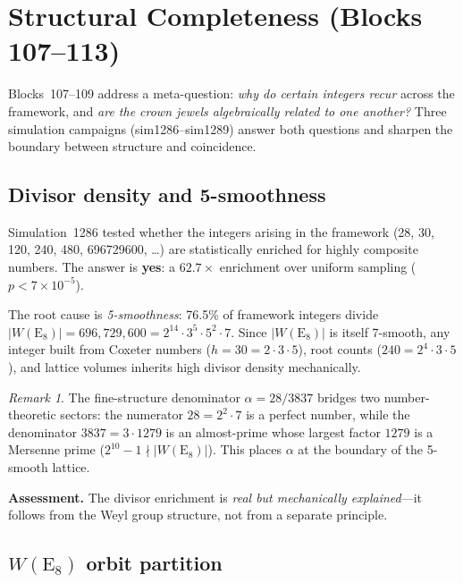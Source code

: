 \documentclass[aps,prd,twocolumn,superscriptaddress,floatfix,nofootinbib]{revtex4-2}
\theoremstyle{definition}
\theoremstyle{remark}
\newtheorem{remark}[theorem]{Remark}
\begin{document}
\section{Structural Completeness (Blocks 107--113)}
\label{sec:structural-completeness}

Blocks~107--109 address a meta-question: \emph{why do certain integers
recur} across the framework, and \emph{are the crown jewels
algebraically related to one another?}  Three simulation campaigns
(sim1286--sim1289) answer both questions and sharpen the boundary
between structure and coincidence.

\subsection{Divisor density and 5-smoothness}
\label{sec:divisor-density}

Simulation~1286 tested whether the integers arising in the framework
(28, 30, 120, 240, 480, 696729600, \ldots) are statistically enriched
for highly composite numbers.  The answer is \textbf{yes}: a $62.7\times$
enrichment over uniform sampling ($p < 7\times 10^{-5}$).

The root cause is \emph{5-smoothness}: 76.5\% of framework integers
divide $|W(\mathrm{E}_8)| = 696{,}729{,}600 = 2^{14}\cdot 3^5 \cdot 5^2 \cdot 7$.
Since $|W(\mathrm{E}_8)|$ is itself 7-smooth, any integer built from Coxeter
numbers ($h = 30 = 2\cdot 3\cdot 5$), root counts ($240 = 2^4\cdot 3\cdot 5$),
and lattice volumes inherits high divisor density mechanically.

\begin{remark}
The fine-structure denominator $\alpha = 28/3837$ bridges two
number-theoretic sectors: the numerator $28 = 2^2\cdot 7$ is a perfect
number, while the denominator $3837 = 3\cdot 1279$ is an almost-prime
whose largest factor $1279$ is a Mersenne prime ($2^{10}-1 \nmid |W(\mathrm{E}_8)|$).
This places $\alpha$ at the boundary of the 5-smooth lattice.
\end{remark}

\noindent
\textbf{Assessment.}  The divisor enrichment is \emph{real but
mechanically explained}---it follows from the Weyl group structure,
not from a separate principle.

\subsection{$W(\mathrm{E}_8)$ orbit partition}
\label{sec:weyl-orbits}
\end{document}
